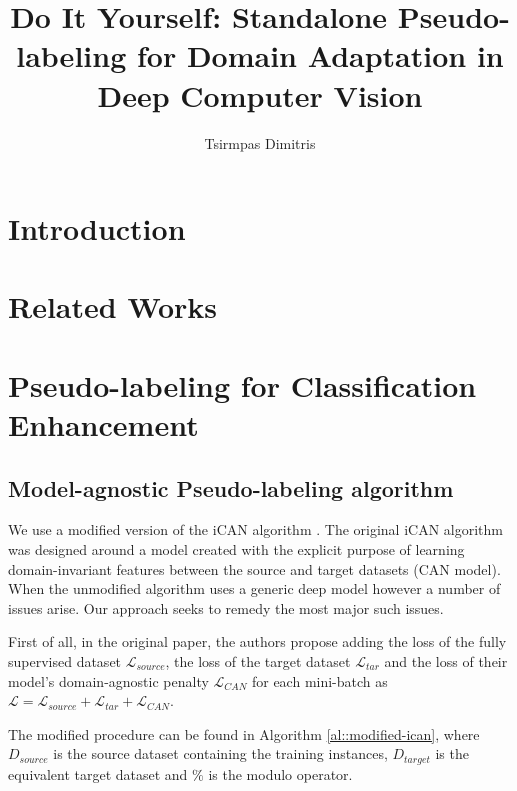 \documentclass{article}
\title{\Huge Do It Yourself: Standalone Pseudo-labeling for Domain Adaptation in Deep Computer Vision}
\author{\LARGE Tsirmpas Dimitris}
\newcommand{\loss}{\mathcal{L}}
\begin{document}
	\begin{titlepage}
		\maketitle
		\thispagestyle{empty} %
			
	\end{titlepage}
	
	\maketitle
	
	
	\section{Introduction}
	
	
	\section{Related Works}
	
	\section{Pseudo-labeling for Classification Enhancement}
	
	\subsection{Model-agnostic Pseudo-labeling algorithm}
	
	We use a modified version of the iCAN algorithm \citep{ican}. The original iCAN algorithm was designed around a model created with the explicit purpose of learning domain-invariant features between the source and target datasets (CAN model). When the unmodified algorithm uses a generic deep model however a number of issues arise. Our approach seeks to remedy the most major such issues.
	
	First of all, in the original paper, the authors propose adding the loss of the fully supervised dataset $\loss_{source}$, the loss of the target dataset $\loss_{tar}$ and the loss of their model's domain-agnostic penalty $\loss_{CAN}$ for each mini-batch as $\loss = \loss_{source} + \loss_{tar} + \loss_{CAN}$. 
		
	The modified procedure can be found in Algorithm \ref{al::modified-ican}, where $D_{source}$ is the source dataset containing the training instances, $D_{target}$ is the equivalent target dataset and $\%$ is the modulo operator.
	
\end{document}
